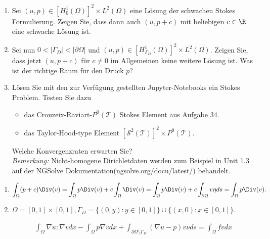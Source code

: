 
\begin{exercise}

\phantom{}

\begin{enumerate}[label = \textbf{\alph*)}]
  \item Sei $(u,p) \in [H_0^1(\Omega)]^2 \times L^2(\Omega)$ eine Lösung der
  schwachen Stokes Formulierung. Zeigen Sie, dass dann auch $(u, p + c)$ mit
  beliebigen $c \in \R$ eine schwache Lösung ist.
  \item Sei nun $0 < |\Gamma_D| < |\partial\Omega|$ und
  $(u,p) \in [H_{\Gamma_D}^1(\Omega)]^2 \times L^2(\Omega)$. Zeigen Sie, dass
  jetzt $(u, p + c)$ für $c \neq 0$ im Allgemeinen keine weitere Lösung ist.
  Was ist der richtige Raum für den Druck $p$?
  \item Lösen Sie mit den zur Verfügung gestellten Jupyter-Notebooks ein
  Stokes Problem. Testen Sie dazu
  \begin{itemize}
    \item das Crouzeix-Raviart-$P^0(\mathcal{T})$ Stokes Element aus Aufgabe 34.
    \item das Taylor-Hood-type Element $[\mathcal{S}^2(\mathcal{T})]^2 \times P^0(\mathcal{T})$.
  \end{itemize}
  Welche Konvergenzraten erwarten Sie? \\
  \textit{Bemerkung:} Nicht-homogene Dirichletdaten werden zum Beispiel in
  Unit 1.3 auf der NGSolve Dokumentation(ngsolve.org/docu/latest/) behandelt.
\end{enumerate}

\end{exercise}


\begin{solution}

\phantom{}

\begin{enumerate}[label = \textbf{\alph*)}]

\item

\begin{align*}
  \int_\Omega (p + c)\Div(v) = \int_\Omega p\Div(v) + c\int_\Omega \Div(v) =
  \int_\Omega p\Div(v) + c\int_{\partial\Omega} v \eta ds = \int_\Omega p\Div(v).
\end{align*}

\item $\Omega = [0,1]\times[0,1], \Gamma_D = \{(0,y): y \in [0,1]\} \cup \{(x,0): x \in [0,1]\}$.

\begin{align*}
  \int_\Omega \nabla u : \nabla v dx - \int_\Omega p \nabla v dx + \int_{\partial \Omega \setminus \Gamma_D} (\nabla u - p)v\nu ds
  = \int_\Omega fv dx
\end{align*}

\end{enumerate}


\end{solution}

